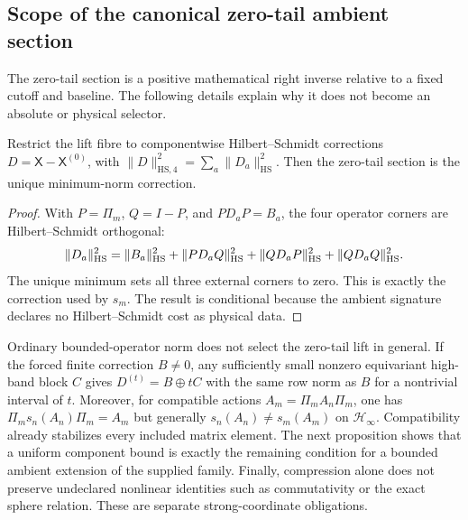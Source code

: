 \documentclass[12pt,a4paper]{article}
\begin{document}
\subsection{Scope of the canonical zero-tail ambient section}
\label{p2c:app:zero-tail-scope}
The zero-tail section is a positive mathematical right inverse relative to a
fixed cutoff and baseline.  The following details explain why it does not
become an absolute or physical selector.

\begin{proposition}
\label{paper2c:proposition:atlas-conditional-hilbert-schmidt-minimum-f448dc3}%

Restrict the lift fibre to componentwise Hilbert--Schmidt corrections
\(D=\mathsf X-\mathsf X^{(0)}\), with
\(\|D\|_{\mathrm{HS},4}^2=\sum_a\|D_a\|_{\mathrm{HS}}^2\).  Then the
zero-tail section is the unique minimum-norm correction.
\end{proposition}

\begin{proof}
With \(P=\Pi_m\), \(Q=I-P\), and \(PD_aP=B_a\), the four operator corners
are Hilbert--Schmidt orthogonal:
\[
 \|D_a\|_{\rm HS}^2
 =\|B_a\|_{\rm HS}^2+\|PD_aQ\|_{\rm HS}^2
 +\|QD_aP\|_{\rm HS}^2+\|QD_aQ\|_{\rm HS}^2.
\]
The unique minimum sets all three external corners to zero.  This is exactly
the correction used by \(s_m\).  The result is conditional because the
ambient signature declares no Hilbert--Schmidt cost as physical data.
\end{proof}

\begin{remark}
Ordinary bounded-operator norm does not select the zero-tail lift in general.
If the forced finite correction \(B\ne0\), any sufficiently small nonzero
equivariant high-band block \(C\) gives
\(D^{(t)}=B\oplus tC\) with the same row norm as \(B\) for a nontrivial
interval of \(t\).  Moreover, for compatible actions \(A_m=\Pi_mA_n\Pi_m\),
one has \(\Pi_ms_n(A_n)\Pi_m=A_m\) but generally
\(s_n(A_n)\ne s_m(A_m)\) on \(\mathcal H_\infty\).  Compatibility already stabilizes every included matrix element. The next
proposition shows that a uniform component bound is exactly the remaining
condition for a bounded ambient extension of the supplied family. Finally,
compression alone does not
preserve undeclared nonlinear identities such as commutativity or the exact
sphere relation.  These are separate strong-coordinate obligations.
\end{remark}
\end{document}
